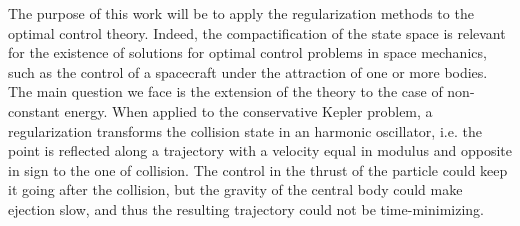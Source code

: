 \documentclass{article}
\begin{document}
 \par The purpose of this work will be to apply the regularization methods to the optimal control theory. Indeed, the compactification of the state space is relevant for the existence of solutions for optimal control problems in space mechanics, such as the control of a spacecraft under the attraction of one or more bodies. The main question we face is the extension of the theory to the case of non-constant energy. When applied to the conservative Kepler problem, a regularization transforms the collision state in an harmonic oscillator, i.e. the point is reflected along a trajectory with a velocity equal in modulus and opposite in sign to the one of collision. The control in the thrust of the particle could keep it going after the collision, but the gravity of the central body could make ejection slow, and thus the resulting trajectory could not be time-minimizing.
\end{document}
